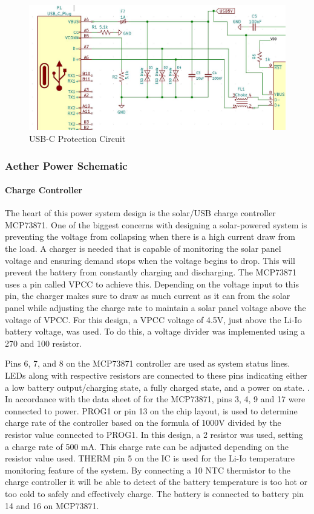 \begin{figure}
    \centering
    \includegraphics[width=5.5in]{figures/USB-Protection.JPG}
    \caption{USB-C Protection Circuit}
    \label{fig:USB-Protection} 
\end{figure}

\subsubsection{Aether Power Schematic}
\paragraph{Charge Controller} The heart of this power system design is the solar/USB charge controller MCP73871. One of the biggest concerns with designing a solar-powered system is preventing the voltage from collapsing when there is a high current draw from the load. A charger is needed that is capable of monitoring the solar panel voltage and ensuring demand stops when the voltage begins to drop. This will prevent the battery from constantly charging and discharging. The MCP73871 uses a pin called VPCC to achieve this. Depending on the voltage input to this pin, the charger makes sure to draw as much current as it can from the solar panel while adjusting the charge rate to maintain a solar panel voltage above the voltage of VPCC. For this design, a VPCC voltage of 4.5V, just above the Li-Io battery voltage, was used. To do this, a voltage divider was implemented using a 270 \kOhm and 100 \kOhm resistor.

Pins 6, 7, and 8 on the MCP73871 controller are used as system status lines. LEDs along with respective resistors are connected to these pins indicating either a low battery output/charging state, a fully charged state, and a power on state. . In accordance with the data sheet of for the MCP73871, pins 3, 4, 9 and 17 were connected to power. PROG1 or pin 13 on the chip layout, is used to determine charge rate of the controller based on the formula of 1000V divided by the resistor value connected to PROG1. In this design, a 2 \kOhm resistor was used, setting a charge rate of 500 mA. This charge rate can be adjusted depending on the resistor value used. THERM pin 5 on the IC is used for the Li-Io temperature monitoring feature of the system. By connecting a 10 \kOhm NTC thermistor to the charge controller it will be able to detect of the battery temperature is too hot or too cold to safely and effectively charge. The battery is connected to battery pin 14 and 16 on MCP73871.

